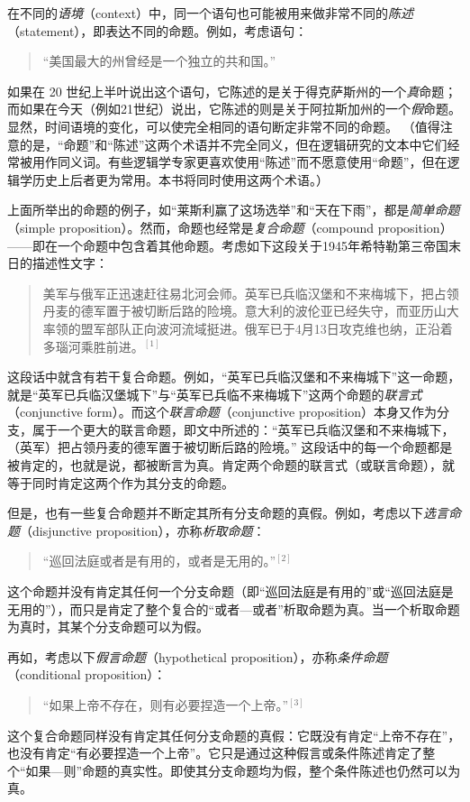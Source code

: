 在不同的\emph{语境}（context）中，同一个语句也可能被用来做非常不同的\emph{陈述}（statement），即表达不同的命题。例如，考虑语句：
\begin{quote}
    “美国最大的州曾经是一个独立的共和国。”
\end{quote}
如果在 20 世纪上半叶说出这个语句，它陈述的是关于得克萨斯州的一个\emph{真}命题；而如果在今天（例如21世纪）说出，它陈述的则是关于阿拉斯加州的一个\emph{假}命题。显然，时间语境的变化，可以使完全相同的语句断定非常不同的命题。
（值得注意的是，“命题”和“陈述”这两个术语并不完全同义，但在逻辑研究的文本中它们经常被用作同义词。有些逻辑学专家更喜欢使用“陈述”而不愿意使用“命题”，但在逻辑学历史上后者更为常用。本书将同时使用这两个术语。）

上面所举出的命题的例子，如“莱斯利赢了这场选举”和“天在下雨”，都是\emph{简单命题}（simple proposition）。然而，命题也经常是\emph{复合命题}（compound proposition）——即在一个命题中包含着其他命题。考虑如下这段关于1945年希特勒第三帝国末日的描述性文字：
\begin{quote}
美军与俄军正迅速赶往易北河会师。英军已兵临汉堡和不来梅城下，把占领丹麦的德军置于被切断后路的险境。意大利的波伦亚已经失守，而亚历山大率领的盟军部队正向波河流域挺进。俄军已于4月13日攻克维也纳，正沿着多瑙河乘胜前进。${ }^{[1]}$
\end{quote}
这段话中就含有若干复合命题。例如，“英军已兵临汉堡和不来梅城下”这一命题，就是“英军已兵临汉堡城下”与“英军已兵临不来梅城下”这两个命题的\emph{联言式}（conjunctive form）。而这个\emph{联言命题}（conjunctive proposition）本身又作为分支，属于一个更大的联言命题，即文中所述的：“英军已兵临汉堡和不来梅城下，（英军）把占领丹麦的德军置于被切断后路的险境。” 这段话中的每一个命题都是被肯定的，也就是说，都被断言为真。肯定两个命题的联言式（或联言命题），就等于同时肯定这两个作为其分支的命题。

但是，也有一些复合命题并不断定其所有分支命题的真假。例如，考虑以下\emph{选言命题}（disjunctive proposition），亦称\emph{析取命题}：
\begin{quote}
    “巡回法庭或者是有用的，或者是无用的。”${ }^{[2]}$
\end{quote}
这个命题并没有肯定其任何一个分支命题（即“巡回法庭是有用的”或“巡回法庭是无用的”），而只是肯定了整个复合的“或者—或者”析取命题为真。当一个析取命题为真时，其某个分支命题可以为假。

再如，考虑以下\emph{假言命题}（hypothetical proposition），亦称\emph{条件命题}（conditional proposition）：
\begin{quote}
    “如果上帝不存在，则有必要捏造一个上帝。”${ }^{[3]}$
\end{quote}
这个复合命题同样没有肯定其任何分支命题的真假：它既没有肯定“上帝不存在”，也没有肯定“有必要捏造一个上帝”。它只是通过这种假言或条件陈述肯定了整个“如果—则”命题的真实性。即使其分支命题均为假，整个条件陈述也仍然可以为真。

